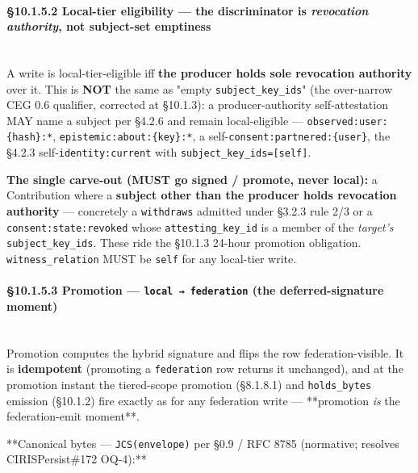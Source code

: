 \documentclass[10pt]{article}
\begin{document}
\paragraph{§10.1.5.2 Local-tier eligibility — the discriminator is \textit{revocation authority}, not subject-set emptiness}\mbox{}\\


A write is local-tier-eligible iff \textbf{the producer holds sole revocation authority} over it. This is \textbf{NOT} the same as "empty \texttt{subject\_key\_ids}" (the over-narrow CEG 0.6 qualifier, corrected at §10.1.3): a producer-authority self-attestation MAY name a subject per §4.2.6 and remain local-eligible — \texttt{observed:user:\{hash\}:*}, \texttt{epistemic:about:\{key\}:*}, a self-\texttt{consent:partnered:\{user\}}, the §4.2.3 self-\texttt{identity:current} with \texttt{subject\_key\_ids=[self]}.


\textbf{The single carve-out (MUST go signed / promote, never local):} a Contribution where a \textbf{subject other than the producer holds revocation authority} — concretely a \texttt{withdraws} admitted under §3.2.3 rule 2/3 or a \texttt{consent:state:revoked} whose \texttt{attesting\_key\_id} is a member of the \textit{target's} \texttt{subject\_key\_ids}. These ride the §10.1.3 24-hour promotion obligation. \texttt{witness\_relation} MUST be \texttt{self} for any local-tier write.


\paragraph{§10.1.5.3 Promotion — \texttt{local → federation} (the deferred-signature moment)}\mbox{}\\


Promotion computes the hybrid signature and flips the row federation-visible. It is \textbf{idempotent} (promoting a \texttt{federation} row returns it unchanged), and at the promotion instant the tiered-scope promotion (§8.1.8.1) and \texttt{holds\_bytes} emission (§10.1.2) fire exactly as for any federation write — **promotion \textit{is} the federation-emit moment**.


**Canonical bytes — \texttt{JCS(envelope)} per §0.9 / RFC 8785 (normative; resolves CIRISPersist\#172 OQ-4):**
\end{document}
